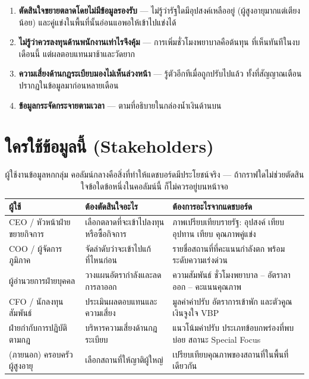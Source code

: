 \documentclass[11pt,a4paper]{article}
\newcommand{\sansall}{\sffamily}
\begin{document}
\begin{enumerate}
\item \textbf{ตัดสินใจขยายตลาดโดยไม่มีข้อมูลรองรับ} --- ไม่รู้ว่ารัฐใดมีอุปสงค์เหลืออยู่
      (ผู้สูงอายุมากแต่เตียงน้อย) และคู่แข่งในพื้นที่นั้นอ่อนแอพอให้เข้าไปแข่งได้
\item \textbf{ไม่รู้ว่าควรลงทุนด้านพนักงานเท่าไรจึงคุ้ม} --- การเพิ่มชั่วโมงพยาบาลคือต้นทุน
      ที่เห็นทันทีในงบเดือนนี้ แต่ผลตอบแทนมาช้าและวัดยาก
\item \textbf{ความเสี่ยงด้านกฎระเบียบมองไม่เห็นล่วงหน้า} --- รู้ตัวอีกทีเมื่อถูกปรับไปแล้ว
      ทั้งที่สัญญาณเตือนปรากฏในข้อมูลมาก่อนหลายเดือน
\item \textbf{ข้อมูลกระจัดกระจายตามเวลา} --- ตามที่อธิบายในกล่องน้ำเงินด้านบน
\end{enumerate}

\section{ใครใช้ข้อมูลนี้ (Stakeholders)}

\begin{table}[H]\centering\small
\begin{tabular}{L{3.6cm} L{5.0cm} L{6.4cm}}
\toprule
\sansall\bfseries ผู้ใช้ & \sansall\bfseries ต้องตัดสินใจอะไร &
\sansall\bfseries ต้องการอะไรจากแดชบอร์ด \\
\midrule
CEO / หัวหน้าฝ่ายขยายกิจการ & เลือกตลาดที่จะเข้าไปลงทุนหรือซื้อกิจการ &
  ภาพเปรียบเทียบรายรัฐ: อุปสงค์ เทียบ อุปทาน เทียบ คุณภาพคู่แข่ง \\
\addlinespace
COO / ผู้จัดการภูมิภาค & จัดลำดับว่าจะเข้าไปแก้ที่ไหนก่อน &
  รายชื่อสถานที่ที่คะแนนกำลังตก พร้อมระดับความเร่งด่วน \\
\addlinespace
ผู้อำนวยการฝ่ายบุคคล & วางแผนอัตรากำลังและลดการลาออก &
  ความสัมพันธ์ ชั่วโมงพยาบาล -- อัตราลาออก -- คะแนนคุณภาพ \\
\addlinespace
CFO / นักลงทุนสัมพันธ์ & ประเมินผลตอบแทนและความเสี่ยง &
  มูลค่าค่าปรับ อัตราการเข้าพัก และตัวคูณเงินจูงใจ VBP \\
\addlinespace
ฝ่ายกำกับการปฏิบัติตามกฎ & บริหารความเสี่ยงด้านกฎระเบียบ &
  แนวโน้มค่าปรับ ประเภทข้อบกพร่องที่พบบ่อย สถานะ Special Focus \\
\addlinespace
(ภายนอก) ครอบครัวผู้สูงอายุ & เลือกสถานที่ให้ญาติผู้ใหญ่ &
  เปรียบเทียบคุณภาพของสถานที่ในพื้นที่เดียวกัน \\
\bottomrule
\end{tabular}
\caption{ผู้ใช้งานข้อมูลหกกลุ่ม คอลัมน์กลางคือสิ่งที่ทำให้แดชบอร์ดมีประโยชน์จริง --- ถ้ากราฟใดไม่ช่วยตัดสินใจข้อใดข้อหนึ่งในคอลัมน์นี้ ก็ไม่ควรอยู่บนหน้าจอ}
\end{table}
\end{document}
